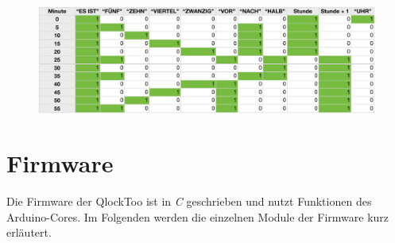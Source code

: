 
\begin{figure}
    \includegraphics[width=\columnwidth]{Abbildungen/Firmware/Logik}
   
\end{figure}

\section{Firmware}
\label{sec:Firmware}
Die Firmware der QlockToo ist in \emph{C} geschrieben und nutzt Funktionen des Arduino-Cores.
Im Folgenden werden die einzelnen Module der Firmware kurz erläutert.

